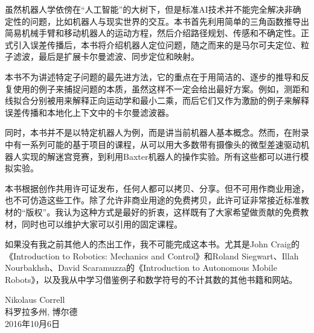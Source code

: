 \documentclass[paper=6.14in:9.21in,pagesize=pdftex,11pt,twoside,openright]{scrbook}
\begin{document}
虽然机器人学依傍在“人工智能”的大树下，但是标准AI技术并不能完全解决非确定性的问题，比如机器人与现实世界的交互。本书首先利用简单的三角函数推导出简易机械手臂和移动机器人的运动方程，然后介绍路径规划、传感和不确定性。正式引入误差传播后，本书将介绍机器人定位问题，随之而来的是马尔可夫定位、粒子滤波，最后是扩展卡尔曼滤波、同步定位和映射。

本书不为讲述特定子问题的最先进方法，它的重点在于用简洁的、逐步的推导和反复使用的例子来捕捉问题的本质，虽然这样不一定会给出最好方案。例如，测距和线拟合分别被用来解释正向运动学和最小二乘，而后它们又作为激励的例子来解释误差传播和本地化上下文中的卡尔曼滤波器。

同时，本书并不是以特定机器人为例，而是讲当前机器人基本概念。然而，在附录中有一系列可能的基于项目的课程，从可以用大多数带有摄像头的微型差速驱动机器人实现的解迷宫竞赛，到利用Baxter机器人的操作实验。所有这些都可以进行模拟实验。

本书根据创作共用许可证发布，任何人都可以拷贝、分享。但不可用作商业用途，也不可仿造这些工作。除了允许非商业用途的免费拷贝，此许可证非常接近标准教材的“版权”。我认为这种方式是最好的折衷，这样既有了大家希望做贡献的免费教材，同时也可以维护大家可以引用的固定课程。

如果没有我之前其他人的杰出工作，我不可能完成这本书。尤其是John Craig的《Introduction to Robotics: Mechanics and Control》和Roland Siegwart、Illah Nourbakhsh、David Scaramuzza的《Introduction to Autonomous Mobile Robots》，以及我从中学习借鉴例子和数学符号的不计其数的其他书籍和网站。



\begin{flushright}
Nikolaus Correll\\
科罗拉多州, 博尔德\\
2016年10月6日
\end{flushright}














\end{document}
